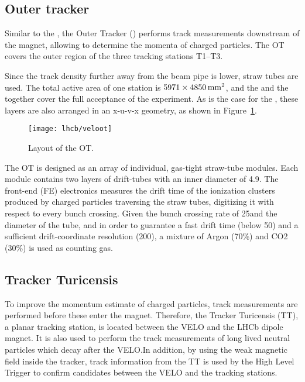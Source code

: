 \subsection{Outer tracker}

Similar to the \intr, the Outer Tracker (\ot) performs track measurements
downstream of the magnet, allowing to determine the momenta of charged
particles. The OT covers the outer region of the three tracking stations T1--T3.

Since the track density further away from the beam pipe is lower, straw tubes
are used. The total active area of one station is $5971\times4850\rm \,mm^2$, and
the \ot and the \intr together cover the full acceptance of the experiment. As is
the case for the \intr, these layers are also arranged in an x-u-v-x geometry, as
shown in Figure~\ref{fig:veloot}.

\begin{figure}[tb]
\begin{center}
\texttt{[image: lhcb/veloot]}
\end{center}
\caption{\small Layout of the OT.}
\label{fig:veloot}
\end{figure}

The OT is designed as an array of individual, gas-tight straw-tube modules.
Each module contains two layers of drift-tubes with an inner diameter of
4.9\mm. The front-end (FE) electronics measures the drift time of the
ionization clusters produced by charged particles traversing the straw tubes,
digitizing it with respect to every bunch crossing. Given the bunch crossing
rate of 25\ns and the diameter of the tube, and in order to guarantee a fast
drift time (below 50\ns) and a sufficient drift-coordinate resolution
(200\mum), a mixture of Argon (70\%) and CO2 (30\%) is used as counting gas.

\subsection{Tracker Turicensis}

To improve the momentum estimate of charged particles, track measurements are
performed before these enter the magnet. Therefore, the Tracker Turicensis
(TT), a planar tracking station, is located between the VELO and the LHCb
dipole magnet. It is also used to perform the track measurements of long lived
neutral particles which decay after the VELO.\@ In addition, by using the weak
magnetic field inside the tracker, track information from the TT is used by the
High Level Trigger to confirm candidates between the VELO and the tracking
stations.

